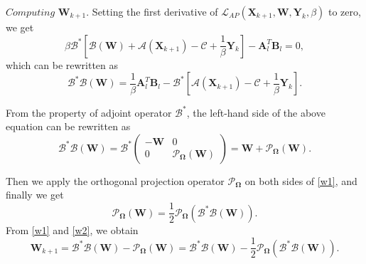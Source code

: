 \documentclass{article}
\begin{document}
{$\textit{Computing}$  $\mathbf W_{k+1}$. Setting the first derivative of
$\mathcal{L}_{AP}(\mathbf X_{k+1},\mathbf W,\mathbf Y_k,\beta)$ to zero, we get
\begin{equation*}
    \beta \mathcal{B}^*\left[ \mathcal{B}(\mathbf W) + \mathcal{A} (\mathbf X_{k+1} ) - \mathcal{C} +\frac{1}{\beta} \mathbf Y_k \right] - \mathbf A_l^T\mathbf B_l = 0,
\end{equation*}
which can be rewritten as
\begin{equation}
    \mathcal{B}^*\mathcal{B}(\mathbf W) = \frac{1}{\beta}\mathbf A_l^T\mathbf B_l - \mathcal{B}^*\left[ \mathcal{A} (\mathbf X_{k+1} ) - \mathcal{C} +\frac{1}{\beta} \mathbf Y_k \right].
\end{equation}

From the property of adjoint operator $\mathcal{B}^*$, the left-hand side of the above equation can be rewritten as
\begin{equation}
    \mathcal{B}^*\mathcal{B}(\mathbf W) = \mathcal{B}^* \begin{pmatrix}
        -\mathbf W & 0 \\
        0 & \mathcal{P}_{\mathbf\Omega}(\mathbf W)
    \end{pmatrix} = \mathbf W + \mathcal{P}_{\mathbf\Omega}(\mathbf W).
    \label{w1}
\end{equation}

Then we apply the orthogonal projection operator $\mathcal{P}_{\mathbf\Omega}$ on both sides of \eqref{w1}, and finally we get
\begin{equation}
    \mathcal{P}_{\mathbf\Omega}(\mathbf W) = \frac{1}{2} \mathcal{P}_{\mathbf\Omega}(\mathcal{B}^*\mathcal{B}(\mathbf W)).\label{w2}
\end{equation}
From \eqref{w1} and \eqref{w2}, we obtain
\begin{equation*}
    \mathbf W_{k+1} = \mathcal{B}^*\mathcal{B}(\mathbf W) - \mathcal{P}_{\mathbf\Omega}(\mathbf W) = \mathcal{B}^*\mathcal{B}(\mathbf W) -\frac{1}{2} \mathcal{P}_{\mathbf\Omega}(\mathcal{B}^*\mathcal{B}(\mathbf W)). 
\end{equation*}

}
\end{document}
